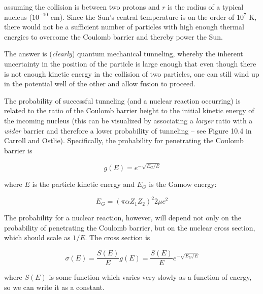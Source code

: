 \noindent assuming the collision is between two protons and $r$ is the radius of a typical nucleus ($10^{-10}$ cm).  Since the Sun's central temperature is on the order of $10^7$ K, there would not be a sufficient number of particles with high enough thermal energies to overcome the Coulomb barrier and thereby power the Sun.

The answer is (\textit{clearly}) quantum mechanical tunneling, whereby the inherent uncertainty in the position of the particle is large enough that even though there is not enough kinetic energy in the collision of two particles, one can still wind up in the potential well of the other and allow fusion to proceed.

The probability of successful tunneling (and a nuclear reaction occurring) is related to the ratio of the Coulomb barrier height to the initial kinetic energy of the incoming nucleus (this can be visualized by associating a \textit{larger} ratio with a \textit{wider} barrier and therefore a lower probability of tunneling -- see Figure 10.4 in Carroll and Ostlie).  Specifically, the probability for penetrating the Coulomb barrier is 

\begin{equation}
g(E) = e^{-\sqrt{E_{G}/E}}
\end{equation}

\noindent where $E$ is the particle kinetic energy and $E_{G}$ is the Gamow energy:

\begin{equation}
E_{G} = \left(\pi \alpha Z_{1} Z_{2} \right)^2 2 \mu c^2
\end{equation}


The probability for a nuclear reaction, however, will depend not only on the probability of penetrating the Coulomb barrier, but on the nuclear cross section, which should scale as $1/E$.  The cross section is

\begin{equation}
\sigma(E) = \frac{S(E)}{E} g(E) =  \frac{S(E)}{E} e^{-\sqrt{E_{G}/E}}
\end{equation}

\noindent where $S(E)$ is some function which varies very slowly as a function of energy, so we can write it as a constant.

